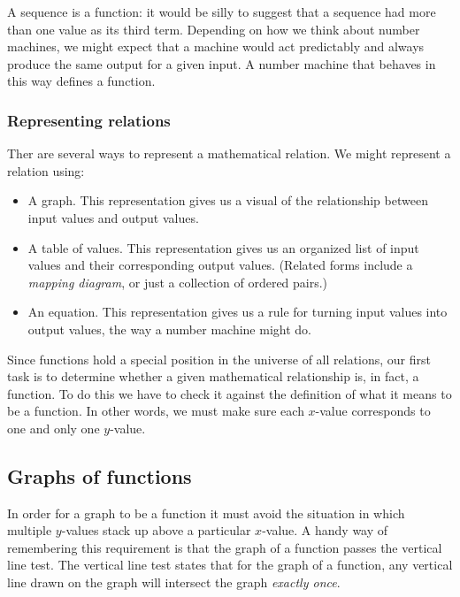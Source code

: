 A sequence is a function: it would be silly to suggest that a sequence had more than one value as its third term. Depending on how we think about number machines, we might expect that a machine would act predictably and always produce the same output for a given input. A number machine that behaves in this way defines a function.

\subsubsection{Representing relations}

Ther are several ways to represent a mathematical relation. We might represent a relation using:
\begin{itemize}
\item A graph. This representation gives us a visual of the relationship between input values and output values.
\item A table of values. This representation gives us an organized list of input values and their corresponding output values. (Related forms include a \textit{mapping diagram}, or just a collection of ordered pairs.)
\item An equation. This representation gives us a rule for turning input values into output values, the way a number machine might do.
\end{itemize}

Since functions hold a special position in the universe of all relations, our first task is to determine whether a given mathematical relationship is, in fact, a function. To do this we have to check it against the definition of what it means to be a function. In other words, we must make sure each $x$-value corresponds to one and only one $y$-value.


\subsection{Graphs of functions}

In order for a graph to be a function it must avoid the situation in which multiple $y$-values stack up above a particular $x$-value. A handy way of remembering this requirement is that the graph of a function passes the \gls{vertical line test}. The vertical line test states that for the graph of a function, any vertical line drawn on the graph will intersect the graph \textit{exactly once}.

